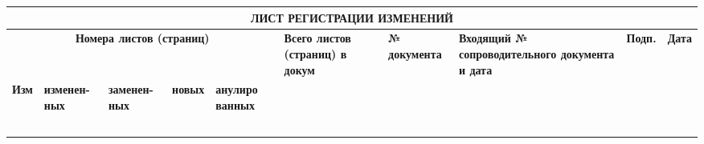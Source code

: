 \documentclass[11pt]{article}
\begin{document}
\newpage
\begin{table}[ht]
    \centering
    \begin{tabularx}{\textwidth}{|X|X|X|X|X|X|X|X|X|X|}
        \hline
        \multicolumn{10}{|c|}{\textbf{ЛИСТ РЕГИСТРАЦИИ ИЗМЕНЕНИЙ}} & \\
        \hline
        \multicolumn{5}{|c|}{\textbf{Номера листов (страниц)}} & \textbf{Всего листов (страниц) в докум} & \textbf{№ документа} & \textbf{Входящий № сопроводительного документа и дата} & \textbf{Подп.} & \textbf{Дата} \\
        \hline
        \textbf{Изм} & \textbf{изменен-ных} & \textbf{заменен-ных} & \textbf{новых} & \textbf{анулиро
ванных
} &  &  &  &  &  \\
        \hline
      &&&&&&&&& \\
      \hline
     &&&&&&&&& \\
      \hline
      &&&&&&&&& \\
      \hline
      &&&&&&&&& \\
      \hline
      &&&&&&&&&  \\
      \hline
    \end{tabularx}

\end{table}
\end{document}
